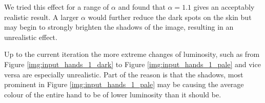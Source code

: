 We tried this effect for a range of $\alpha$ and found that $\alpha = 1.1$ gives an acceptably realistic result. A larger $\alpha$ would further reduce the dark spots on the skin but may begin to strongly brighten the shadows of the image, resulting in an unrealistic effect.

Up to the current iteration the more extreme changes of luminosity, such as from Figure \ref{img:input_hands_1_dark} to Figure \ref{img:input_hands_1_pale} and vice versa are especially unrealistic. Part of the reason is that the shadows, most prominent in Figure \ref{img:input_hands_1_pale} may be causing the average colour of the entire hand to be of lower luminosity than it should be. 